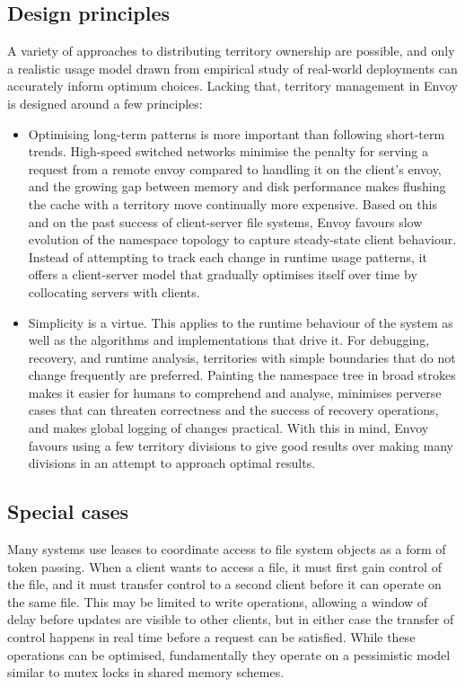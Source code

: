 \subsection{Design principles}

A variety of approaches to distributing territory ownership are possible, and only a realistic usage model drawn from empirical study of real-world deployments can accurately inform optimum choices. Lacking that, territory management in Envoy is designed around a few principles:

\begin{itemize}
\item Optimising long-term patterns is more important than following short-term trends. High-speed switched networks minimise the penalty for serving a request from a remote envoy compared to handling it on the client's envoy, and the growing gap between memory and disk performance makes flushing the cache with a territory move continually more expensive. Based on this and on the past success of client-server file systems, Envoy favours slow evolution of the namespace topology to capture steady-state client behaviour. Instead of attempting to track each change in runtime usage patterns, it offers a client-server model that gradually optimises itself over time by collocating servers with clients.

\item Simplicity is a virtue. This applies to the runtime behaviour of the system as well as the algorithms and implementations that drive it. For debugging, recovery, and runtime analysis, territories with simple boundaries that do not change frequently are preferred. Painting the namespace tree in broad strokes makes it easier for humans to comprehend and analyse, minimises perverse cases that can threaten correctness and the success of recovery operations, and makes global logging of changes practical. With this in mind, Envoy favours using a few territory divisions to give good results over making many divisions in an attempt to approach optimal results.
\end{itemize}

\subsection{Special cases}

Many systems use leases to coordinate access to file system objects as a form of token passing. When a client wants to access a file, it must first gain control of the file, and it must transfer control to a second client before it can operate on the same file. This may be limited to write operations, allowing a window of delay before updates are visible to other clients, but in either case the transfer of control happens in real time before a request can be satisfied. While these operations can be optimised, fundamentally they operate on a pessimistic model similar to mutex locks in shared memory schemes.

